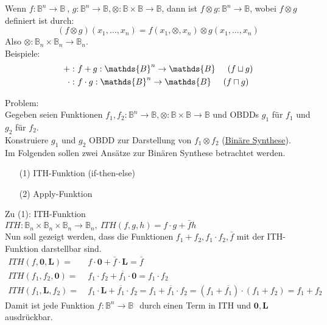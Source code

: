 \documentclass[ngerman]{scrartcl}
\theoremstyle{custom}
\newcommand{\0}{\mathbf{0}}
\newcommand{\1}{\mathbf{L}}
\newcommand{\bol}{\mathds{B}^n \rightarrow \mathds{B}}
\newcommand{\bolf}{$f: \bol~$}
\begin{document}
Wenn \bolf, $g: \mathds{B}^n \rightarrow \mathds{B}, \otimes:
\mathds{B} \times \mathds{B} \rightarrow \mathds{B}$, dann ist $f
\otimes g: \mathds{B}^n \rightarrow \mathds{B}$, wobei $f \otimes g$
definiert ist durch:
\begin{equation*}
(f \otimes g)(x_1,\dots,x_n) = f(x_1,\otimes,x_n) \otimes g(x_1,\dots,x_n)
\end{equation*}
Also $\otimes :  \mathds{B}_n \times \mathds{B}_n \rightarrow
\mathds{B}_n$.\\

Beispiele:
\begin{align*}
+:& ~f + g: \mathds{B}^n \rightarrow \mathds{B} \hspace{0.5cm} (f
\sqcup g)\\
\cdot:& ~f \cdot g: \mathds{B}^n \rightarrow \mathds{B} \hspace{0.5cm} (f
\sqcap g)
\end{align*}

Problem:\\
Gegeben seien Funktionen $f_1,f_2: \mathds{B}^n \rightarrow \mathds{B},
\otimes: \mathds{B} \times \mathds{B} \rightarrow \mathds{B}$ und
OBDDs $g_1$ f\"ur $f_1$ und $g_2$ f\"ur $f_2$.\\
Konstruiere $g_1$ und $g_2$ OBDD zur Darstellung von $f_1 \otimes f_2$
(\underline{Bin\"are Synthese}).\\

Im Folgenden sollen zwei Ans\"atze zur Bin\"aren Synthese betrachtet
werden.
\begin{itemize}
\item[(1)] ITH-Funktion (if-then-else)
\item[(2)] Apply-Funktion
\end{itemize}

Zu (1): ITH-Funktion\\
$ITH: \mathds{B}_n \times \mathds{B}_n \times \mathds{B}_n \rightarrow
\mathds{B}_n, ~ITH(f,g,h) = f \cdot g + \bar f h$\\

Nun soll gezeigt werden, dass die Funktionen $f_1+f_2, f_1 \cdot f_2,
\bar f$ mit der ITH-Funktion darstellbar sind.
\begin{align*}
ITH(f,\0, \1) =&~ f \cdot \0 + \bar f \cdot \1 = \bar f \\
ITH(f_1,f_2, \0 ) =&~ f_1 \cdot f_2 + \overline{f_1} \cdot \0 = f_1 \cdot
f_2\\
ITH(f_1,\1,f_2) = &~ f_1 \cdot \1 + \overline{f_1} \cdot f_2 = f_1 +
\overline{f_1} \cdot f_2 = (f_1 + \overline{f_1}) \cdot (f_1 + f_2) = f_1 + f_2
\end{align*}
Damit ist jede Funktion \bolf ~durch einen Term in ITH und $\0,\1$
ausdr\"uckbar.\\
\end{document}
